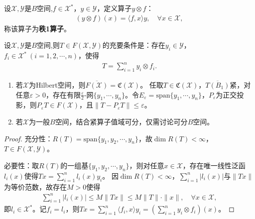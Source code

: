 \documentclass[../../main.tex]{subfiles}%
\begin{document}
\begin{definition}
设$\mathscr{X},\mathscr{Y}$是$B$空间,$f\in\mathscr{X}^*$，$y\in\mathscr{Y}$，定义算子$y\otimes f$：
\begin{align*}
(y\otimes f)(x)=\langle f,x\rangle y,\quad \forall x\in\mathscr{X},
\end{align*}
称该算子为\textbf{秩1算子}。
\end{definition}

\begin{theorem}
设$\mathscr{X},\mathscr{Y}$是$B$空间,则$T\in F(\mathscr{X},\mathscr{Y})$的充要条件是：存在$y_i\in\mathscr{Y}$，$f_i\in\mathscr{X}^*\ (i=1,2,\cdots,n)$，使得
\begin{align*}
T=\sum\limits_{i=1}^{n}y_i\otimes f_i.
\end{align*}
\end{theorem}
\begin{remark}
\begin{enumerate}[(1)]
\item 若$\mathscr{X}$为Hilbert空间，则$\overline{F(\mathscr{X})}=\mathfrak{C}(\mathscr{X})$。
任取$T\in\mathfrak{C}(\mathscr{X})$，$\overline{T(B_1)}$紧，对任意$\varepsilon>0$，存在有限$\frac{\varepsilon}{2}$-网$\{y_1,\cdots,y_n\}$。令$E_\varepsilon=\mathrm{span}\{y_1,\cdots,y_n\}$，$P_\varepsilon$为正交投影，则$P_\varepsilon T\in F(\mathscr{X})$，且$\|T-P_\varepsilon T\|\leqslant\varepsilon$。
\item 若$\mathscr{X}$为一般$B$空间，结合紧算子值域可分，仅需讨论可分$B$空间。
\end{enumerate}
\end{remark}
\begin{proof}

{\heiti 充分性：}$R(T)=\mathrm{span}\{y_1,y_2,\cdots,y_n\}$，故$\dim R(T)<\infty$，$T\in F(\mathscr{X},\mathscr{Y})$。

{\heiti 必要性：}取$R(T)$的一组基$\{y_1,y_2,\cdots,y_n\}$，则对任意$x\in\mathscr{X}$，存在唯一线性泛函$l_i(x)$使得$Tx=\sum\limits_{i=1}^{n}l_i(x)y_i$。
因$\dim R(T)<\infty$，$\sum\limits_{i=1}^{n}|l_i(x)|$与$\|Tx\|$为等价范数，故存在$M>0$使得
\begin{align*}
\sum\limits_{i=1}^{n}|l_i(x)|\leqslant M\|Tx\|\leqslant M\|T\|\cdot\|x\|,\quad \forall x\in\mathscr{X},
\end{align*}
即$l_i\in\mathscr{X}^*$。记$f_i=l_i$，则$Tx=\sum\limits_{i=1}^{n}\langle f_i,x\rangle y_i=\left(\sum\limits_{i=1}^{n}y_i\otimes f_i\right)(x)$。
\end{proof}
\end{document}

